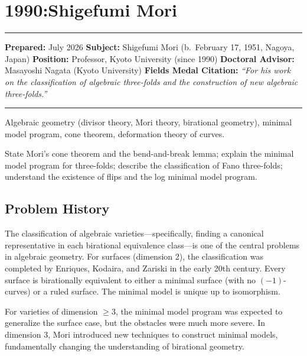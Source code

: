 \chapter{1990:Shigefumi Mori}\label{ch1990shigefumimori:shigefumi-mori-fields-medal-1990-a-comprehensive-report}

\begin{center}\rule{0.5\linewidth}{0.5pt}\end{center}

\textbf{Prepared:} July 2026 \textbf{Subject:} Shigefumi Mori (b.~February 17, 1951, Nagoya, Japan)
\textbf{Position:} Professor, Kyoto University (since 1990)
\textbf{Doctoral Advisor:} Masayoshi Nagata (Kyoto University)
\textbf{Fields Medal Citation:} \emph{``For his work on the classification of algebraic three-folds and the construction of new algebraic three-folds.''}

\begin{center}\rule{0.5\linewidth}{0.5pt}\end{center}

\begin{prereqs}
Algebraic geometry (divisor theory, Mori theory, birational geometry),
minimal model program, cone theorem, deformation theory of curves.
\end{prereqs}

\begin{objectives}
State Mori's cone theorem and the bend-and-break lemma;
explain the minimal model program for three-folds;
describe the classification of Fano three-folds;
understand the existence of flips and the log minimal model program.
\end{objectives}

\section{Problem History}

The classification of algebraic varieties---specifically, finding a canonical
representative in each birational equivalence class---is one of the central
problems in algebraic geometry. For surfaces (dimension 2), the classification
was completed by Enriques, Kodaira, and Zariski in the early 20th century.
Every surface is birationally equivalent to either a minimal surface (with no
$(-1)$-curves) or a ruled surface. The minimal model is unique up to
isomorphism.

For varieties of dimension $\geq 3$, the minimal model program was expected to
generalize the surface case, but the obstacles were much more severe. In
dimension 3, Mori introduced new techniques to construct minimal models,
fundamentally changing the understanding of birational geometry.

